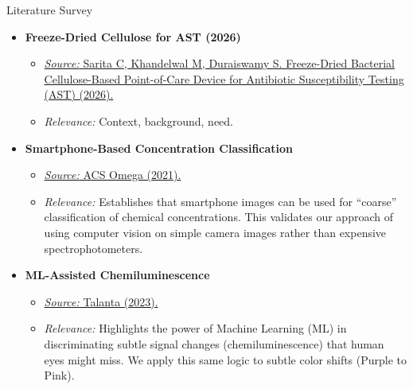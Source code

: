 \documentclass{beamer}
\begin{document}
\begin{frame}{Literature Survey}
    \begin{itemize}
        \item \textbf{Freeze-Dried Cellulose for AST (2026)}
        \begin{itemize}
            \item \href{https://pubmed.ncbi.nlm.nih.gov/41537486/}{\textit{Source:} Sarita C, Khandelwal M, Duraiswamy S. Freeze-Dried Bacterial Cellulose-Based Point-of-Care Device for Antibiotic Susceptibility Testing (AST) (2026).}
            \item \textit{Relevance:} Context, background, need.
        \end{itemize}
        \vspace{0.2cm}
        
        \item \textbf{Smartphone-Based Concentration Classification}
        \begin{itemize}
            \item \href{https://pubs.acs.org/doi/10.1021/acsomega.1c05086}{\textit{Source:} ACS Omega (2021).}
            \item \textit{Relevance:} Establishes that smartphone images can be used for ``coarse'' classification of chemical concentrations. This validates our approach of using computer vision on simple camera images rather than expensive spectrophotometers.
        \end{itemize}
        \vspace{0.2cm}
        
        \item \textbf{ML-Assisted Chemiluminescence}
        \begin{itemize}
            \item \href{https://www.sciencedirect.com/science/article/pii/S0039914023011979}{\textit{Source:} Talanta (2023).}
            \item \textit{Relevance:} Highlights the power of Machine Learning (ML) in discriminating subtle signal changes (chemiluminescence) that human eyes might miss. We apply this same logic to subtle color shifts (Purple to Pink).
        \end{itemize}
    \end{itemize}
\end{frame}
\end{document}
